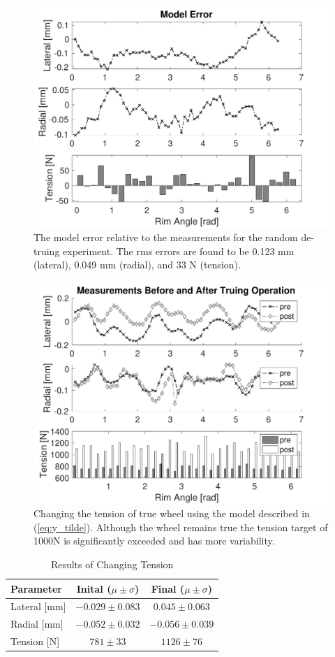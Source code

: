 \documentclass[journal]{IEEEtran}
\begin{document}
\begin{figure}[!t]
\centering
\includegraphics[width=3.25 in]{./figs/exp1_err} %
\caption{The model error relative to the measurements for the random de-truing experiment.  The rms errors are found to be 0.123 mm (lateral), 0.049 mm (radial), and 33 N (tension).}
\label{fig:exp1_err}
\end{figure}

\begin{figure}[!t]
\centering
\includegraphics[width=3.25 in]{./figs/exp_cnst_shift} %
\caption{Changing the tension of true wheel using the model described in (\ref{eq:y_tilde}).  Although the wheel remains true the tension target of 1000N is significantly exceeded and has more variability. }
\label{fig:exp_cnst_shift}
\end{figure}

\begin{table}[!t]
\caption{Results of Changing Tension}
\label{tbl:const_shift}
\centering
\begin{tabular}{| l | c | c |}
    \hline
    Parameter & Inital ($\mu \pm \sigma$) & Final ($\mu \pm \sigma$)\\ \hline
    Lateral [mm] & $-0.029\pm0.083$ &$0.045\pm 0.063$ \\ \hline 
    Radial [mm] &$-0.052\pm0.032$& $-0.056\pm0.039$ \\ \hline 
    Tension [N] &$781\pm33$& $1126\pm76$ \\ \hline 
\end{tabular}
\end{table}
\end{document}
